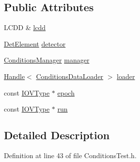 \subsection*{Public Attributes}
\begin{DoxyCompactItemize}
\item 
LCDD \& \hyperlink{struct_d_d4hep_1_1_conditions_1_1_test_1_1_test_env_a6939ff406dbff1ad30aa6ce492dc3ebf}{lcdd}
\item 
\hyperlink{namespace_d_d4hep_a21dd977310ff183f61ca6ae14b59a989}{DetElement} \hyperlink{struct_d_d4hep_1_1_conditions_1_1_test_1_1_test_env_a08451dbdbf34ecff0e383bb617f78c29}{detector}
\item 
\hyperlink{class_d_d4hep_1_1_conditions_1_1_conditions_manager}{ConditionsManager} \hyperlink{struct_d_d4hep_1_1_conditions_1_1_test_1_1_test_env_aadbe3c1f12fe6972edbf18f58359a107}{manager}
\item 
\hyperlink{class_d_d4hep_1_1_handle}{Handle}$<$ \hyperlink{class_d_d4hep_1_1_conditions_1_1_conditions_data_loader}{ConditionsDataLoader} $>$ \hyperlink{struct_d_d4hep_1_1_conditions_1_1_test_1_1_test_env_acf0847e9018a0793ef805d2a16b033a5}{loader}
\item 
const \hyperlink{class_d_d4hep_1_1_i_o_v_type}{IOVType} $\ast$ \hyperlink{struct_d_d4hep_1_1_conditions_1_1_test_1_1_test_env_a71fce3b33ebcdf5f35f433f88e6ab9d6}{epoch}
\item 
const \hyperlink{class_d_d4hep_1_1_i_o_v_type}{IOVType} $\ast$ \hyperlink{struct_d_d4hep_1_1_conditions_1_1_test_1_1_test_env_adf17ffc8d010573be87030ddc963d947}{run}
\end{DoxyCompactItemize}


\subsection{Detailed Description}


Definition at line 43 of file ConditionsTest.h.

